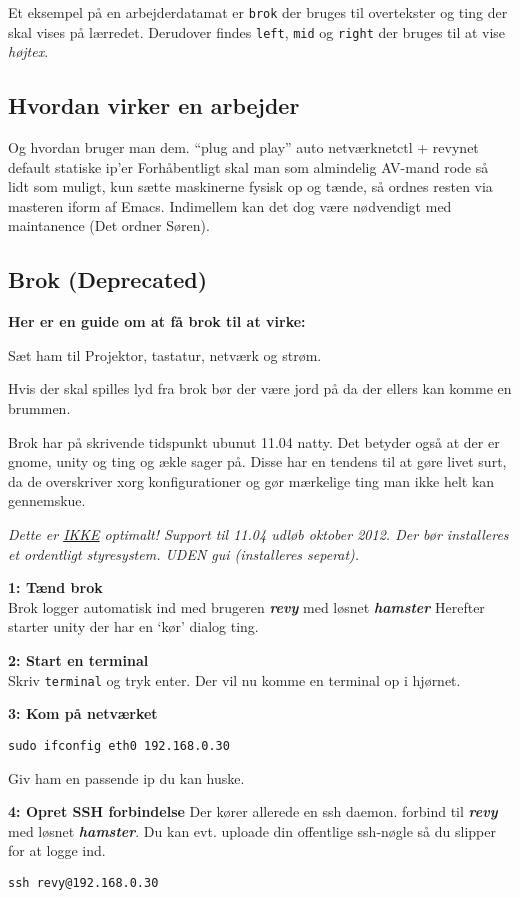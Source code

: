 \documentclass[10pt,a4paper,danish]{article}
\newcommand{\code}[1]{\colorbox{verbgray}{\texttt{#1}}}
\begin{document}
Et eksempel på en arbejderdatamat er \texttt{brok} der bruges til overtekster og ting der
skal vises på lærredet.
Derudover findes \texttt{left}, \texttt{mid} og \texttt{right} der bruges til at vise \textit{højtex}.


\subsection{Hvordan virker en arbejder}
Og hvordan bruger man dem.
``plug and play''
auto netværknetctl + revynet
default statiske ip'er
Forhåbentligt skal man som almindelig AV-mand rode så lidt som muligt, kun sætte
maskinerne fysisk op og tænde, så ordnes resten via masteren iform af Emacs.
Indimellem kan det dog være nødvendigt med maintanence (Det ordner Søren).


\subsection{Brok (Deprecated)}
\textbf{Her er en guide om at få brok til at virke:}

Sæt ham til
Projektor, tastatur, netværk og strøm.

Hvis der skal spilles lyd fra brok bør der være jord på da der ellers kan komme
en brummen.

Brok har på skrivende tidspunkt ubunut 11.04 natty.
Det betyder også at der er gnome, unity og ting og ækle sager på.
Disse har en tendens til at gøre livet surt, da de overskriver xorg
konfigurationer og gør mærkelige ting man ikke helt kan gennemskue.

\textit{Dette er \uline{IKKE} optimalt!
  Support til 11.04 udløb oktober 2012. Der bør installeres et ordentligt
  styresystem. UDEN gui (installeres seperat).}

\textbf{1: Tænd brok}\\
Brok logger automatisk ind med brugeren \textbf{\textit{revy}} med løsnet \textbf{\textit{hamster}}
Herefter starter unity der har en `kør' dialog ting.

\textbf{2: Start en terminal}\\
Skriv \code{terminal} og tryk enter.
Der vil nu komme en terminal op i hjørnet.

\textbf{3: Kom på netværket}\\
\begin{verbatim}
sudo ifconfig eth0 192.168.0.30
\end{verbatim}
Giv ham en passende ip du kan huske.

\textbf{4: Opret SSH forbindelse}
Der kører allerede en ssh daemon.
forbind til \textbf{\textit{revy}} med løsnet \textbf{\textit{hamster}}.
Du kan evt. uploade din offentlige ssh-nøgle så du slipper for at logge ind.
\begin{verbatim}
ssh revy@192.168.0.30
\end{verbatim}
\end{document}
